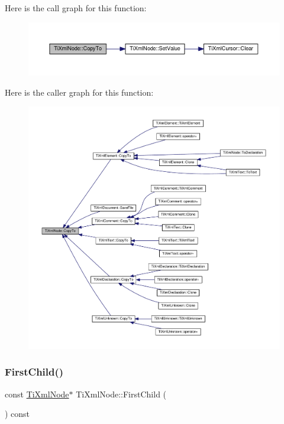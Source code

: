 Here is the call graph for this function\+:\nopagebreak
\begin{figure}[H]
\begin{center}
\leavevmode
\includegraphics[width=350pt]{class_ti_xml_node_aaadd5bb9c94f84c4472b649b95de4a0b_cgraph}
\end{center}
\end{figure}
Here is the caller graph for this function\+:\nopagebreak
\begin{figure}[H]
\begin{center}
\leavevmode
\includegraphics[width=350pt]{class_ti_xml_node_aaadd5bb9c94f84c4472b649b95de4a0b_icgraph}
\end{center}
\end{figure}
\mbox{\label{class_ti_xml_node_aa66bceae19707c90c1db12d7c98894a4}} 
\subsubsection{\texorpdfstring{First\+Child()}{FirstChild()}\hspace{0.1cm}{\footnotesize\ttfamily [1/4]}}
{\footnotesize\ttfamily const \hyperlink{class_ti_xml_node}{Ti\+Xml\+Node}$\ast$ Ti\+Xml\+Node\+::\+First\+Child (\begin{DoxyParamCaption}{ }\end{DoxyParamCaption}) const\hspace{0.3cm}{\ttfamily [inline]}}



